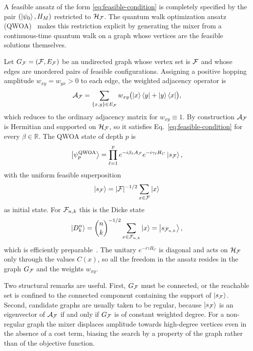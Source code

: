 A feasible ansatz of the form \eqref{eq:feasible-condition} is completely specified by the pair $(\ket{\psi_0},H_M)$ restricted to $\mathcal{H}_{\mathcal{F}}$. The quantum walk optimization ansatz (QWOA)~\cite{Marsh2019,Marsh2020} makes this restriction explicit by generating the mixer from a continuous-time quantum walk on a graph whose vertices are the feasible solutions themselves.

Let $G_{\mathcal{F}}=(\mathcal{F},E_{\mathcal{F}})$ be an undirected graph whose vertex set is $\mathcal{F}$ and whose edges are unordered pairs of feasible configurations. Assigning a positive hopping amplitude $w_{xy}=w_{yx}>0$ to each edge, the weighted adjacency operator is
\begin{equation}
\mathcal{A}_{\mathcal{F}} = \sum_{\{x,y\}\in E_{\mathcal{F}}} w_{xy}\bigl(\ket{x}\bra{y}+\ket{y}\bra{x}\bigr),
    \label{eq:feasible-adjacency}
\end{equation}
which reduces to the ordinary adjacency matrix for $w_{xy}\equiv1$. By construction $\mathcal{A}_{\mathcal{F}}$ is Hermitian and supported on $\mathcal{H}_{\mathcal{F}}$, so it satisfies Eq.~\eqref{eq:feasible-condition} for every $\beta\in\mathbb{R}$. The QWOA state of depth $p$ is
\begin{equation}
\bigl|\psi_p^{\mathrm{QWOA}}\bigr\rangle = \prod_{\ell=1}^{p} e^{-i\beta_\ell \mathcal{A}_{\mathcal{F}}} e^{-i\gamma_\ell H_C} \ket{s_{\mathcal{F}}},
    \label{eq:qwoa-state}
\end{equation}
with the uniform feasible superposition
\begin{equation}
\ket{s_{\mathcal{F}}} = |\mathcal{F}|^{-1/2} \sum_{x\in\mathcal{F}}\ket{x}
    \label{eq:uniform-feasible-state}
\end{equation}
as initial state. For $\mathcal{F}_{n,k}$ this is the Dicke state
\begin{equation}
\ket{D^{n}_{k}} = \binom{n}{k}^{-1/2} \sum_{x\in\mathcal{F}_{n,k}}\ket{x} = \ket{s_{\mathcal{F}_{n,k}}} ,
    \label{eq:dicke-state}
\end{equation}
which is efficiently preparable~\cite{Bartschi2019}. The unitary $e^{-i\gamma H_C}$ is diagonal and acts on $\mathcal{H}_{\mathcal{F}}$ only through the values $C(x)$, so all the freedom in the ansatz resides in the graph $G_{\mathcal{F}}$ and the weights $w_{xy}$.

Two structural remarks are useful. First, $G_{\mathcal{F}}$ must be connected, or the reachable set is confined to the connected component containing the support of $\ket{s_{\mathcal{F}}}$. Second, candidate graphs are usually taken to be regular, because $\ket{s_{\mathcal{F}}}$ is an eigenvector of $\mathcal{A}_{\mathcal{F}}$ if and only if $G_{\mathcal{F}}$ is of constant weighted degree. For a non-regular graph the mixer displaces amplitude towards high-degree vertices even in the absence of a cost term, biasing the search by a property of the graph rather than of the objective function.


